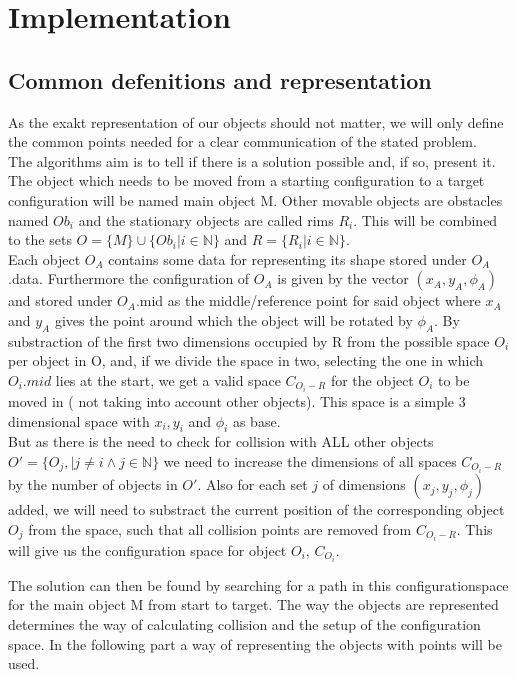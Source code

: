 \chapter{Implementation}
\label{cha:Implementation}
\section{Common defenitions and representation}
As the exakt representation of our objects should not matter, we will only define the common points needed for a clear communication of the stated problem.\\
The algorithms aim is to tell if there is a solution possible and, if so, present it. The object which needs to be moved from a starting configuration to a target configuration will be named main object M. Other movable objects are obstacles named $Ob_i$  and the stationary objects are called rims $R_i$. This will be combined to the sets $O = \{M\}  \cup \{Ob_i | i \in \mathbb{N} \} $ and $ R = \{ R_i | i \in \mathbb{N}\}$.\\

Each object $O_A$ contains some data for representing its shape stored under $O_A$.data. Furthermore the configuration of $O_A$ is given by the vector $(x_A,y_A,\phi_A)$ and stored under $O_A$.mid as the middle/reference point for said object where $x_A$ and $y_A$ gives the point around which the object will be rotated by $\phi_A$.
By substraction of the first two dimensions occupied by R from the possible space $O_i$ per object in O, and, if we divide the space in two, selecting the one in which $O_i.mid$ lies at the start, we get a valid space $C_{O_i-R}$ for the object $O_i$ to be moved in ( not taking into account other objects). This space is a simple 3 dimensional space with $x_i, y_i$ and $\phi_i$ as base.\\
But as there is the need to check for collision with ALL other objects $O' = \{O_j, | j\neq i \wedge j \in \mathbb{N}\} $ we need to increase the dimensions of all spaces $C_{O_i-R}$ by the number of objects in $O'$. Also for each set $j$ of dimensions $(x_j,y_j,\phi_j)$  added, we will need to substract the current position of the corresponding object $O_j$ from the space, such that all collision points are removed from $C_{O_i-R}$. This will give us the configuration space for object $O_i$, $C_{O_i}$.

The solution can then be found by searching for a path in this configurationspace for the main object M from start to target. The way the objects are represented determines the way of calculating collision and the setup of the configuration space. In the following part a way of representing the objects with points will be used.


